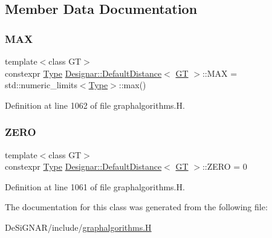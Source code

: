 \subsection{Member Data Documentation}
\mbox{\label{class_designar_1_1_default_distance_af1c417705ee2d66f828c0f872607a7ea}} 
\subsubsection{\texorpdfstring{M\+AX}{MAX}}
{\footnotesize\ttfamily template$<$class GT$>$ \\
constexpr \hyperlink{class_designar_1_1_default_distance_a9317a5edf566779550b96edd532b502b}{Type} \hyperlink{class_designar_1_1_default_distance}{Designar\+::\+Default\+Distance}$<$ \hyperlink{demo-buildgraph_8_c_a3001c40d2c31ca87ed96cd7d1334a55e}{GT} $>$\+::M\+AX = std\+::numeric\+\_\+limits$<$\hyperlink{class_designar_1_1_default_distance_a9317a5edf566779550b96edd532b502b}{Type}$>$\+::max()\hspace{0.3cm}{\ttfamily [static]}}



Definition at line 1062 of file graphalgorithms.\+H.

\mbox{\label{class_designar_1_1_default_distance_abee3d9a2a3f573d6844c0a0fdbd4d7ac}} 
\subsubsection{\texorpdfstring{Z\+E\+RO}{ZERO}}
{\footnotesize\ttfamily template$<$class GT$>$ \\
constexpr \hyperlink{class_designar_1_1_default_distance_a9317a5edf566779550b96edd532b502b}{Type} \hyperlink{class_designar_1_1_default_distance}{Designar\+::\+Default\+Distance}$<$ \hyperlink{demo-buildgraph_8_c_a3001c40d2c31ca87ed96cd7d1334a55e}{GT} $>$\+::Z\+E\+RO = 0\hspace{0.3cm}{\ttfamily [static]}}



Definition at line 1061 of file graphalgorithms.\+H.



The documentation for this class was generated from the following file\+:\begin{DoxyCompactItemize}
\item 
De\+Si\+G\+N\+A\+R/include/\hyperlink{graphalgorithms_8_h}{graphalgorithms.\+H}\end{DoxyCompactItemize}
